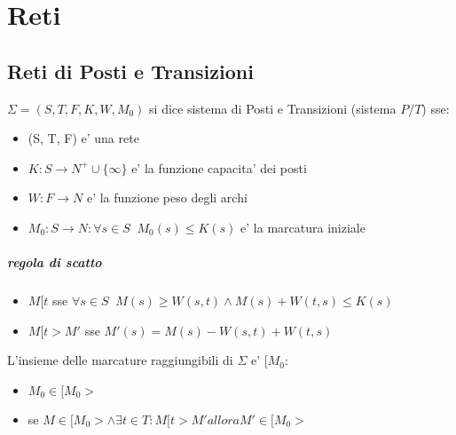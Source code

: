 \chapter{Reti}

\section{Reti di Posti e Transizioni}

$\Sigma  = (S, T, F, K, W, M_0)$ si dice sistema di Posti e Transizioni (sistema $P/T$) sse:
\begin{itemize}
    \item (S, T, F) e' una rete
    \item $K : S \rightarrow N^+ \cup \{\infty\}$ e' la funzione capacita' dei posti
    \item $W : F \rightarrow N$ e' la funzione peso degli archi
    \item $M_0 : S \rightarrow N : \forall s \in S \;\; M_0(s) \leq K(s)$ e' la marcatura iniziale
\end{itemize}

\paragraph{regola di scatto}

\begin{itemize}
    \item $M[t$ sse $\forall s \in S \;\; M(s) \geq W(s, t) \land M(s) + W(t, s) \leq K(s)$
    \item $M[t > M'$ sse $M'(s) = M(s) - W(s, t) + W(t, s)$
\end{itemize}

L'insieme delle marcature raggiungibili di $\Sigma$ e' $[M_0$:
\begin{itemize}
    \item $M_0 \in [M_0 >$
    \item se $M \in [M_0 > \land \exists t \in T : M[t > M' allora M' \in [M_0 >$
\end{itemize}
